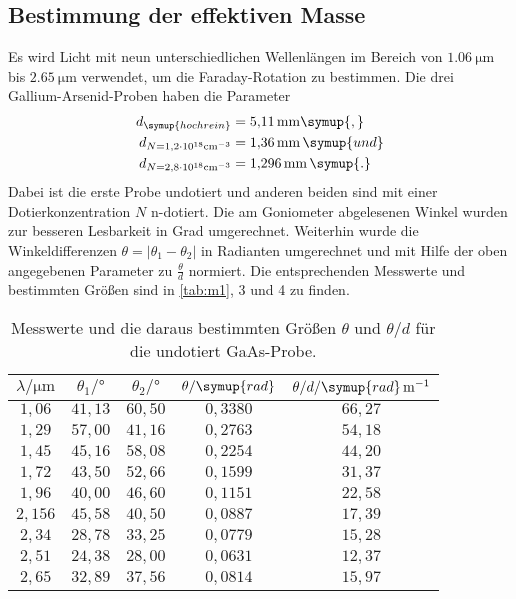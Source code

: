 \subsection{Bestimmung der effektiven Masse}
Es wird Licht mit neun unterschiedlichen Wellenlängen im Bereich von $\SI{1,06}{\micro\meter}$ bis
$\SI{2,65}{\micro\meter}$ verwendet, um die Faraday-Rotation zu bestimmen. Die drei Gallium-Arsenid-Proben haben
die Parameter
\begin{align*}
  d_{\symup{hochrein}} &= \SI{5,11}{\milli\meter}\symup{,} \\
  d_{N=1,2 \cdot 10^{18} \si{cm}^{-3}} &= \SI{1,36}{\milli\meter}\,\symup{ und} \\
  d_{N=2,8 \cdot 10^{18} \si{cm}^{-3}} &= \SI{1,296}{\milli\meter}\,\symup{.}
\end{align*}
Dabei ist die erste Probe undotiert und anderen beiden sind mit einer Dotierkonzentration $N$ n-dotiert.
Die am Goniometer abgelesenen Winkel wurden zur besseren Lesbarkeit in Grad umgerechnet. Weiterhin wurde die
Winkeldifferenzen $\theta = |\theta_{1} - \theta_{2}|$ in Radianten umgerechnet und mit Hilfe der oben angegebenen
Parameter zu $\frac{\theta}{d}$ normiert.
Die entsprechenden Messwerte und bestimmten Größen sind in \autoref{tab:m1}, 3 und 4 zu finden.
\begin{table}[hbt!]
  \centering
  \caption{Messwerte und die daraus bestimmten Größen $\theta$ und $\theta/d$ für die undotiert GaAs-Probe.}
  \label{tab:m1}
  \begin{tabular}{c c c c c}
    \toprule
    $\lambda/\si{\micro\meter}$ & $\theta_{1}/\si{\degree}$ & $\theta_{2}/\si{\degree}$ & $\theta/\symup{rad}$ & $\theta/d/\symup{rad}\, \si{m}^{-1}$\\
    \midrule
    $1,06 $ & $41,13$ & $60,50$ & $0,3380$ & $66,27$ \\
    $1,29 $ & $57,00$ & $41,16$ & $0,2763$ & $54,18$ \\
    $1,45 $ & $45,16$ & $58,08$ & $0,2254$ & $44,20$ \\
    $1,72 $ & $43,50$ & $52,66$ & $0,1599$ & $31,37$ \\
    $1,96 $ & $40,00$ & $46,60$ & $0,1151$ & $22,58$ \\
    $2,156$ & $45,58$ & $40,50$ & $0,0887$ & $17,39$ \\
    $2,34 $ & $28,78$ & $33,25$ & $0,0779$ & $15,28$ \\
    $2,51 $ & $24,38$ & $28,00$ & $0,0631$ & $12,37$ \\
    $2,65 $ & $32,89$ & $37,56$ & $0,0814$ & $15,97$ \\
    \bottomrule
  \end{tabular}
\end{table}

